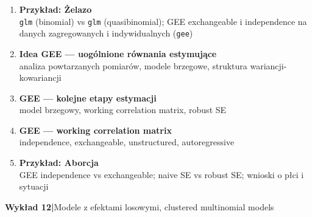 \documentclass[a4paper,11pt]{article}
\begin{document}
\begin{enumerate}[label=\textbf{\arabic*.}, leftmargin=1.8em, itemsep=3pt, topsep=2pt]
        {\small\color{medgray}funkcja quasi-wiarygodności, warunki redukcji do ML}
  \item \textbf{Przykład: Żelazo}\\
        {\small\color{medgray}\texttt{glm} (binomial) vs \texttt{glm} (quasibinomial); GEE exchangeable i independence na danych zagregowanych i indywidualnych (\texttt{gee})}
  \item \textbf{Idea GEE --- uogólnione równania estymujące}\\
        {\small\color{medgray}analiza powtarzanych pomiarów, modele brzegowe, struktura wariancji-kowariancji}
  \item \textbf{GEE --- kolejne etapy estymacji}\\
        {\small\color{medgray}model brzegowy, working correlation matrix, robust SE}
  \item \textbf{GEE --- working correlation matrix}\\
        {\small\color{medgray}independence, exchangeable, unstructured, autoregressive}
  \item \textbf{Przykład: Aborcja}\\
        {\small\color{medgray}GEE independence vs exchangeable; naive SE vs robust SE; wnioski o płci i sytuacji}
\end{enumerate}
 
\vspace{1em}
 
\begin{mdframed}[
  backgroundcolor=lightblue,
  linecolor=borderblue,
  linewidth=0.8pt,
  innerleftmargin=10pt,
  innerrightmargin=10pt,
  innertopmargin=6pt,
  innerbottommargin=6pt,
  roundcorner=4pt
]
  \textbf{\color{accentblue}Wykład 12\quad|\quad}{\color{darkgray}Modele z efektami losowymi, clustered multinomial models}
\end{mdframed}
 
\end{document}

